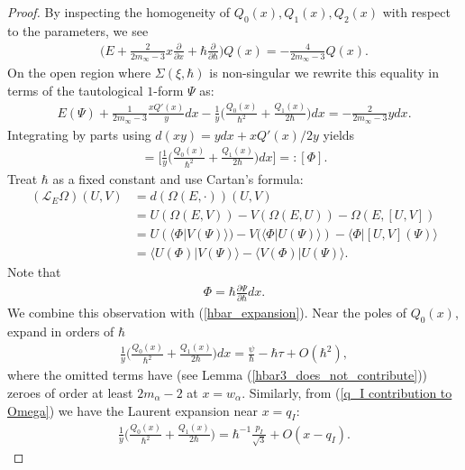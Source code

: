 \documentclass[a4paper,12pt,reqno]{amsart}
\numberwithin{equation}{section}
\numberwithin{counter2}{section}
\begin{document}
\begin{proof}
By inspecting the homogeneity of $Q_0(x),Q_1(x),Q_2(x)$ with respect to the parameters,  we see
\begin{align}
\Bigg( E + \frac{2}{2m_\infty -3}x\frac{\partial}{\partial x} + \hbar\frac{\partial}{\partial \hbar} \Bigg)Q(x) = -\frac{4}{2m_\infty-3}Q(x).  
\end{align}
On the open region where $\Sigma(\xi,\hbar)$ is non-singular we rewrite this equality in terms of the tautological $1$-form $\Psi$ as:
\begin{align}
E(\Psi) + \frac{1}{2m_\infty-3}\frac{x Q'(x)}{y}dx - \frac{1}{y}\Bigg(\frac{Q_0(x)}{\hbar^2}+\frac{Q_1(x)}{2\hbar} \Bigg)dx = -\frac{2}{2m_\infty-3}ydx.  
\end{align}
Integrating by parts using $d(xy) = ydx + xQ'(x)/2y$ yields
\begin{align}
[E(\Psi)] = \Bigg[\frac{1}{y}\Bigg(\frac{Q_0(x)}{\hbar^2}+\frac{Q_1(x)}{2\hbar} \Bigg)dx\Bigg] =: [\Phi]. 
\end{align}
Treat $\hbar$ as a fixed constant and use Cartan's formula:
\begin{align}
(\mathcal{L}_E\Omega)(U,V) &= d(\Omega(E,\cdot))(U,V)  \nonumber \\
&= U(\Omega(E,V)) - V(\Omega(E,U)) - \Omega(E,[U,V]) \nonumber \\
&= U( \langle \Phi | V(\Psi) \rangle) - V (\langle \Phi | U(\Psi) \rangle ) - \langle \Phi | [U,V](\Psi)\rangle \nonumber \\
&= \langle U(\Phi) | V(\Psi) \rangle - \langle V(\Phi) | U(\Psi) \rangle.  
\end{align}
Note that 
\begin{align}
\Phi = \hbar \frac{\partial \Psi}{\partial \hbar} dx.  
\end{align}
We combine this observation with (\ref{hbar_expansion}).   
Near the poles of $Q_0(x)$,  expand in orders of $\hbar$
\begin{align}
\frac{1}{y}\Bigg(\frac{Q_0(x)}{\hbar^2}+\frac{Q_1(x)}{2\hbar} \Bigg) dx = \frac{\psi}{\hbar} - \hbar\tau + O(\hbar^2),  
\end{align}
where the omitted terms have  (see Lemma (\ref{hbar3_does_not_contribute})) zeroes of order at least $2m_\alpha - 2$ at $x = w_\alpha$.  
Similarly,  from (\ref{q_I contribution to Omega}) we have the Laurent expansion near $x = q_I$:
\begin{align}
\frac{1}{y}\Bigg(\frac{Q_0(x)}{\hbar^2}+\frac{Q_1(x)}{2\hbar} \Bigg) = \hbar^{-1}\frac{p_I}{\sqrt{3}} + O(x-q_I).  

\end{align}
\end{proof}
\end{document}
